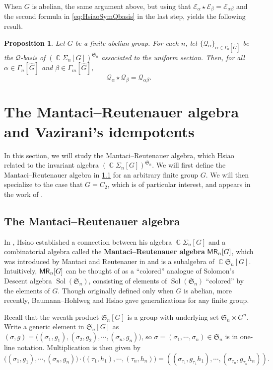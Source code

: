 \documentclass[11pt, oneside, reqno]{amsart}
\newtheorem{prop}[theorem]{Proposition}
\theoremstyle{definition}
\numberwithin{equation}{section}
\DeclareMathOperator{\C}{\mathbb{C}}
\newcommand{\defn}[1]{{\color{RoyalBlue}\bf#1}}
\def \MR {{\sf{MR}}}
\def \kk{\C}
\def \sym{\mathfrak{S}}
\def \wh{\widehat}
\def \ztwo {{C_2}}
\def \gsetcomposition{{\Sigma_n[G]}}
\def \hsiao {{\gsetcomposition}}
\DeclareMathOperator{\sol}{Sol}
\newcommand{\SB}[1]{\mathcal{#1}} 		%
\begin{document}
When $G$ is abelian, the same argument above, but using that $\SB{E}_\alpha \star \SB{E}_\beta = \SB{E}_{\alpha\beta}$ and the second formula in \cref{eq:HsiaoSymQbasis} in the last step, yields the following result.

\begin{prop}\label{prop:SymQ-basis-star}
    Let $G$ be a finite abelian group.
    For each $n$, let $\{\SB{Q}_\alpha\}_{\alpha \in \Gamma_n[\wh{G}]}$ be the $\SB{Q}$-basis of $(\kk\hsiao)^{\sym_n}$ associated to the uniform section.
    Then, for all $\alpha \in \Gamma_n[\wh{G}]$ and $\beta \in \Gamma_m[\wh{G}]$,
    \[
        \SB{Q}_\alpha \star \SB{Q}_\beta = \SB{Q}_{\alpha \beta}.
    \]
\end{prop}


\section{The Mantaci--Reutenauer algebra and Vazirani's idempotents}\label{sec:MRalg}
In this section, we will study the Mantaci--Reutenauer algebra, which Hsiao related to the invariant algebra $(\kk \hsiao)^{\sym_n}$. We will first define the Mantaci--Reutenauer algebra in \cref{s:MRalgebra} for an arbitrary finite group $G$. We will then specialize to the case that $G = \ztwo$, which is of particular interest, and appears in the work of \cite{vazirani, DouTom2018decomposition, brauner2023type,BauHoh2008solomon}.


\subsection{The Mantaci--Reutenauer algebra}\label{s:MRalgebra}

In \cite{hsiao2007semigroup}, Hsiao established a connection between his algebra $\kk \hsiao$ and a combinatorial algebra called the \defn{Mantaci--Reutenauer algebra} $\MR_n[G]$, which was introduced by Mantaci and Reutenauer in \cite{MR95} and is a subalgebra of $\kk \sym_n[G]$.
Intuitively, $\MR_n[G]$ can be thought of as a ``colored'' analogue of Solomon's Descent algebra $\sol(\sym_n)$, consisting of elements of $\sol(\sym_n)$ ``colored'' by the elements of $G$.
Though originally defined only when $G$ is abelian, more recently, Baumann--Hohlweg \cite{BauHoh2008solomon} and Hsiao \cite{hsiao2007semigroup} gave generalizations for any finite group.

Recall that the wreath product $\sym_n[G]$ is a group with underlying set $\sym_n \times G^n$. Write a generic element in $\sym_n[G]$ as $(\sigma,g) = \big( (\sigma_1,g_1), (\sigma_2, g_2), \cdots, (\sigma_n, g_n) \big)$, so $\sigma = (\sigma_1, \cdots, \sigma_n) \in \sym_n$ is in one-line notation. Multiplication is then given by
\[ \big( (\sigma_1,g_1),  \cdots, (\sigma_n, g_n) \big) \cdot \big( (\tau_1,h_1), \cdots, (\tau_n, h_n) \big) = ((\sigma_{\tau_1},g_{\tau_1}h_1), \cdots, (\sigma_{\tau_n},g_{\tau_n}h_n)).\]
\end{document}
